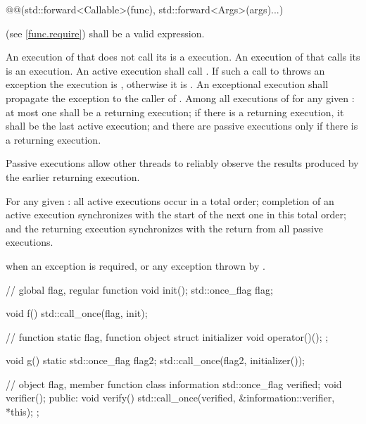 \begin{itemdescr}
\pnum
\requires
\begin{codeblock}
@@(std::forward<Callable>(func), std::forward<Args>(args)...)
\end{codeblock}
(see \ref{func.require}) shall be a valid expression.

\pnum
\effects
An execution of  that does not call its  is a
 execution. An execution of  that calls its 
is an  execution. An active execution shall call
. If such a call to 
throws an exception the execution is , otherwise it is .
An exceptional execution shall propagate the exception to the caller of
. Among all executions of  for any given
: at most one shall be a returning execution; if there is a
returning execution, it shall be the last active execution; and there are
passive executions only if there is a returning execution.
\begin{note}
Passive
executions allow other threads to reliably observe the results produced by the
earlier returning execution.
\end{note}

\pnum
\sync
For any given : all active executions occur in a total
order; completion of an active execution synchronizes with
the start of the next one in this total order; and the returning execution
synchronizes with the return from all passive executions.

\pnum
\throws
{} when
an exception is required, or any exception thrown by .

\pnum
\begin{example}
\begin{codeblock}
// global flag, regular function
void init();
std::once_flag flag;

void f() {
  std::call_once(flag, init);
}

// function static flag, function object
struct initializer {
  void operator()();
};

void g() {
  static std::once_flag flag2;
  std::call_once(flag2, initializer());
}

// object flag, member function
class information {
  std::once_flag verified;
  void verifier();
public:
  void verify() { std::call_once(verified, &information::verifier, *this); }
};
\end{codeblock}
\end{example}
\end{itemdescr}


